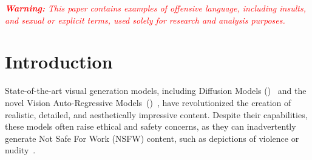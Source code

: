 
\textcolor{red}{\textit{\textbf{Warning:} This paper contains examples of offensive language, including insults, and  sexual or explicit terms, used solely for research and analysis purposes.
}}

\section{Introduction}

State-of-the-art visual generation models, including Diffusion Models (\DMs)~\citep{esser2024scalingSD3,DeepFloydIF,flux} and the novel Vision Auto-Regressive Models~(\IARMs)~\citep{han2024infinity,tian2024visual}, have revolutionized the creation of realistic, detailed, and aesthetically impressive content. Despite their capabilities, these models often raise ethical and safety concerns, as they can inadvertently generate Not Safe For Work (NSFW) content, such as depictions of violence or nudity~\citep{qu2023unsafe,rando2022red,yang2024sneakyprompt}.

